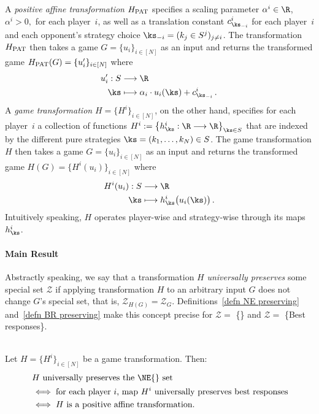 A \textit{positive affine transformation} $H_{\textnormal{PAT}}$ specifies a scaling parameter $\alpha^i \in \R$, $\alpha^i >0,$ for each player~$i$, as well as a translation constant $c_{\ks_{-i}}^i$ for each player~$i$ and each opponent's strategy choice $\ks_{-i} = (k_j \in S^j)_{j \neq i}$. The transformation $H_{\textnormal{PAT}}$ then takes a game $G = \{u_i\}_{i \in [N]}$ as an input and returns the transformed game $H_{\textnormal{PAT}}(G) = \{u_i'\}_{i \in [N]}$ where
\begin{align*}
u_i' : S &\longrightarrow \R \\
\ks &\longmapsto \alpha_i \cdot u_i(\ks) + c_{\ks_{-i}}^i \, . \,
\end{align*}
A \textit{game transformation} $H = \{H^i\}_{i \in [N]}$, on the other hand, specifies for each player~$i$ a collection of functions $H^i := \big\{ h_{\ks}^i : \R \longrightarrow \R \big\}_{\ks \in S}$ that are indexed by the different pure strategies $\ks = (k_1, \ldots, k_N) \in S$. The game transformation $H$ then takes a game $G = \{u_i\}_{i \in [N]}$ as an input and returns the transformed game $H(G) = \{H^i(u_i)\}_{i \in [N]}$ where 
\begin{align*}
H^i(u_i) : S &\longrightarrow \R \\
\ks &\longmapsto h_{\ks}^i \big( u_i(\ks) \big) \, .
\end{align*}
Intuitively speaking, $H$ operates player-wise and strategy-wise through its maps $h_{\ks}^i$.

\paragraph{Main Result} 
Abstractly speaking, we say that a transformation $H$ \textit{universally preserves} some special set $\mathcal{Z}$ if applying transformation $H$ to an arbitrary input $G$ does not change $G$'s special set, that is, $\mathcal{Z}_{H(G)} = \mathcal{Z}_G$. Definitions~\ref{defn NE preserving} and~\ref{defn BR preserving} make this concept precise for $\mathcal{Z}=$ \{\NEs{}\} and $\mathcal{Z}=$ \{Best responses\}. 

\begin{thm*} 
\, \\
Let $H = \{H^i\}_{i \in [N]}$ be a game transformation. Then:
\begin{align*}
&\, H \text{ universally preserves the \NE{} set} \\
&\iff \text{for each player~$i$, map $H^i$ universally preserves best responses} \\
&\iff H \text{ is a positive affine transformation.}
\end{align*}
\end{thm*}

